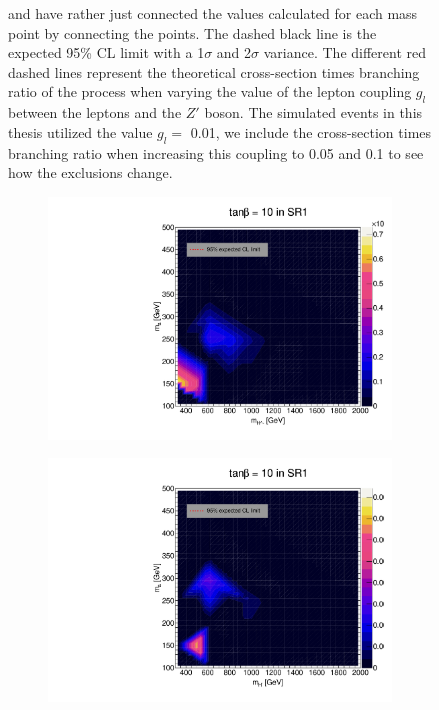 \documentclass[12pt, a4paper]{book}
\begin{document}
\begin{figure}[!ht]
{   and have rather just connected the values calculated for each mass point by connecting the points. The dashed black line is the expected 95\% CL limit with a 1$\sigma$ and 2$\sigma$ variance. 
   The different red dashed lines represent the theoretical cross-section times branching ratio of the process when varying the value of the lepton coupling $g_l$ between the leptons and the $Z'$ boson. The simulated events in this thesis utilized the value $g_l=$ 0.01, we include the cross-section times branching ratio when increasing this coupling to 0.05 and 0.1 to see how the exclusions change.  }\label{fig:EFT_LDS_exclusion_ee_uu}
\end{figure}

\begin{figure}[!ht]
	\centering
	\begin{subfigure}[b]{0.49\textwidth}
      \centering
      \includegraphics[width=1\textwidth]{Limits/Model_independent/50-100/2HDM/2HDM_ee_tb10.pdf}
   \end{subfigure}
   \hfill
   \begin{subfigure}[b]{0.49\textwidth}
      \centering
      \includegraphics[width=1\textwidth]{Limits/Model_independent/50-100/2HDM/2HDM_uu_tb10.pdf}

\end{subfigure}
\end{figure}
\end{document}
